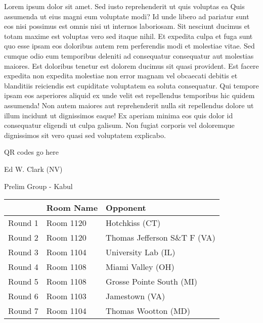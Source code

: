 \documentclass{article}%
\begin{document}
\vspace*{8pt}%
\linebreak%
\newline%
\newline%
Lorem ipsum dolor sit amet. Sed iusto reprehenderit ut quis voluptas ea Quis assumenda ut eius magni eum voluptate modi? Id unde libero ad pariatur sunt eos nisi possimus est omnis nisi ut internos laboriosam. Sit nesciunt ducimus et totam maxime est voluptas vero sed itaque nihil. Et expedita culpa et fuga sunt quo esse ipsam eos doloribus autem rem perferendis modi et molestiae vitae.\newline%
\newline%
Sed cumque odio eum temporibus deleniti ad consequatur consequatur aut molestias maiores. Est doloribus tenetur est dolorem ducimus sit quasi provident. Est facere expedita non expedita molestiae non error magnam vel obcaecati debitis et blanditiis reiciendis est cupiditate voluptatem ea soluta consequatur. Qui tempore ipsam eos asperiores aliquid ex unde velit est repellendus temporibus hic quidem assumenda!\newline%
\newline%
Non autem maiores aut reprehenderit nulla sit repellendus dolore ut illum incidunt ut dignissimos eaque! Ex aperiam minima eos quis dolor id consequatur eligendi ut culpa galisum. Non fugiat corporis vel doloremque dignissimos sit vero quasi sed voluptatem explicabo.\newline%
\newline%
%
\vspace*{30pt}%
\begin{center}%
\begin{Huge}%
QR codes go here%
\end{Huge}%
\end{center}%
\newpage%
%
\begin{center}%
\begin{Huge}%
Ed W. Clark (NV)%
\end{Huge}%
\vspace*{8pt}%
\linebreak%
\begin{Large}%
Prelim Group {-} Kabul%
\end{Large}%
\end{center}%
\begin{tabularx}{\textwidth}{|c|Y|Y|}%
\hline%
&Room Name&Opponent\\%
\hline%
Round 1&Room 1120&Hotchkiss (CT)\\%
Round 2&Room 1120&Thomas Jefferson S\&T F (VA)\\%
Round 3&Room 1104&University Lab (IL)\\%
Round 4&Room 1108&Miami Valley (OH)\\%
Round 5&Room 1108&Grosse Pointe South (MI)\\%
Round 6&Room 1103&Jamestown (VA)\\%
Round 7&Room 1104&Thomas Wootton (MD)\\%
\hline%
\end{tabularx}%
\end{document}
